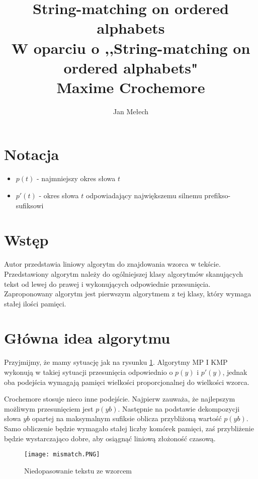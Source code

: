 \documentclass[a4paper,11pt]{article}
\title{String-matching on ordered alphabets \\ \large W oparciu o ,,String-matching on ordered alphabets"\\ Maxime Crochemore}
\author{Jan Mełech}
\date{}
\theoremstyle{definition}
\begin{document}
\maketitle

\section{Notacja}
\begin{itemize}
    \item $p(t)$ - najmniejszy okres słowa $t$
    \item $p'(t)$ - okres słowa $t$ odpowiadający największemu silnemu prefikso-sufiksowi
\end{itemize}

\section{Wstęp}

Autor przedstawia liniowy algorytm do znajdowania wzorca w tekście. Przedstawiony algorytm należy do ogólniejszej klasy algorytmów skanujących tekst od lewej do prawej i wykonujących odpowiednie przesunięcia. Zaproponowany algorytm jest pierwszym algorytmem z tej klasy, który wymaga stałej ilości pamięci.


\section{Główna idea algorytmu}

Przyjmijmy, że mamy sytuację jak na rysunku \ref{fig:mismatch}. Algorytmy MP I KMP wykonują w takiej sytuacji przesunięcia odpowiednio o $p(y)$ i $p'(y)$, jednak oba podejścia wymagają pamięci wielkości proporcjonalnej do wielkości wzorca. 
\par 
Crochemore stosuje nieco inne podejście. Najpierw zauważa, że najlepszym możliwym przesunięciem jest $p(yb)$. Następnie na podstawie dekompozycji słowa $yb$ opartej na maksymalnym sufiksie oblicza przybliżoną wartość  $p(yb)$. Samo obliczenie będzie wymagało stałej liczby komórek pamięci, zaś przybliżenie będzie wystarczająco dobre, aby osiągnąć liniową złożoność czasową.

\begin{figure}
    \centering
    \texttt{[image: mismatch.PNG]} \\
    \caption{Niedopasowanie tekstu ze wzorcem}
    \label{fig:mismatch}
\end{figure}
\end{document}
